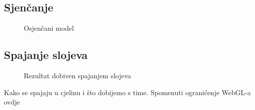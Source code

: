 \subsection{Sjenčanje}

\begin{figure}[H]
\label{fig:monkey-toon}
\begin{center}
\caption{Osjenčani model}
\end{center}
\end{figure}

\subsection{Spajanje slojeva}

\begin{figure}[H]
\label{fig:monkey-final}
\begin{center}
\caption{Rezultat dobiven spajanjem slojeva}
\end{center}
\end{figure}

Kako se spajaju u cjelinu i što dobijemo s time. Spomenuti ograničenje WebGL-a ovdje